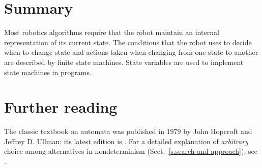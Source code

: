 \section{Summary}

Most robotics algorithms require that the robot maintain an internal representation of its current state. The conditions that the robot uses to decide when to change state and actions taken when changing from one state to another are described by finite state machines. State variables are used to implement state machines in programs.

\section{Further reading}

The classic textbook on automata was published in 1979 by John Hopcroft and Jeffrey D. Ullman; its latest edition is \cite{automata}. For a detailed explanation of \emph{arbitrary} choice among alternatives in nondeterminism (Sect.~\ref{s.search-and-approach}), see \cite[Sect.~2.4]{pcdp2}.



